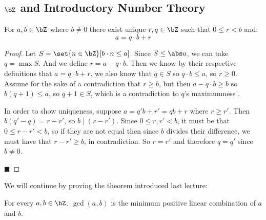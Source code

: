 \documentclass[10pt]{article}
\let\divides=\mid
\begin{document}


\bigskip

\subsection{$\bZ$ and Introductory Number Theory}

\begin{prop*}

    For $a,b\in\bZ$ where $b\neq0$ there exist unique $r,q\in\bZ$ such that $0\leq r<b$ and:
    \[ a = q\cdot b + r \]

\end{prop*}

\begin{proof}

    Let $S=\set{n\in\bZ}[b\cdot n\leq a]$.
    Since $S\leq\abs a$, we can take $q=\max S$.
    And we define $r=a-q\cdot b$.
    Then we know by their respective definitions that $a=q\cdot b + r$.
    we also know that $q\in S$ so $q\cdot b\leq a$, so $r\geq0$.
    Assume for the sake of a contradiction that $r\geq b$, but then $a-q\cdot b\geq b$ so $b(q+1)\leq a$, so $q+1\in S$, which is a contradiction to $q$'s maximumness
    \lightning.

    In order to show uniqueness, suppose $a=q'b+r'=qb+r$ where $r\geq r'$.
    Then $b(q'-q)=r-r'$, so $b\divides(r-r')$.
    Since $0\leq r,r'<b$, it must be that $0\leq r-r'<b$, so if they are not equal then since $b$ divides their difference, we must have that $r-r'\geq b$, in contradiction.
    So $r=r'$ and therefore $q=q'$ since $b\neq 0$.

    \hfill$\blacksquare$

\end{proof}

We will continue by proving the theorem introduced last lecture:

\begin{thrm*}

    For every $a,b\in\bZ$, $\gcd(a,b)$ is the minimum positive linear combination of $a$ and $b$.

\end{thrm*}
\end{document}
